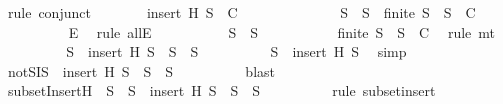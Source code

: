 \begin{isabellebody}
\ {\isacharparenleft}rule\ conjunct{}{\isacharparenright}\isanewline
\ \ \ \ \isamarkupfalse%
\ \isamarkupfalse%
\ {\isachardoublequoteopen}insert\ H\ S{}\ {\isasymnotin}\ C{\isachardoublequoteclose}\isanewline
\ \ \ \ \isamarkupfalse%
\ {\isacharminus}\isanewline
\ \ \ \ \ \ \isamarkupfalse%
\ {\isachardoublequoteopen}S{}\ {\isasymsubseteq}\ S\ {\isasymlongrightarrow}\ finite\ S{}\ {\isasymlongrightarrow}\ S{}\ {\isasymin}\ C{\isachardoublequoteclose}\isanewline
\ \ \ \ \ \ \ \ \isamarkupfalse%
\ E{\isacharprime}\ \isamarkupfalse%
\ {\isacharparenleft}rule\ allE{\isacharparenright}\isanewline
\ \ \ \ \ \ \isamarkupfalse%
\ \isamarkupfalse%
\ {\isachardoublequoteopen}{\isasymnot}\ S{}\ {\isasymsubseteq}\ S{\isachardoublequoteclose}\isanewline
\ \ \ \ \ \ \ \ \isamarkupfalse%
\ {\isacartoucheopen}{\isasymnot}\ {\isacharparenleft}finite\ S{}\ {\isasymlongrightarrow}\ S{}\ {\isasymin}\ C{\isacharparenright}{\isacartoucheclose}\ \isamarkupfalse%
\ {\isacharparenleft}rule\ mt{\isacharparenright}\isanewline
\ \ \ \ \ \ \isamarkupfalse%
\ \isamarkupfalse%
\ {\isachardoublequoteopen}{\isacharparenleft}S{}\ {\isasymsubseteq}\ insert\ H\ S{\isacharparenright}\ {\isasymnoteq}\ {\isacharparenleft}S{}\ {\isasymsubseteq}\ S{\isacharparenright}{\isachardoublequoteclose}\isanewline
\ \ \ \ \ \ \ \ \isamarkupfalse%
\ {\isacartoucheopen}S{}\ {\isasymsubseteq}\ insert\ H\ S{\isacartoucheclose}\ \isamarkupfalse%
\ simp\ \isanewline
\ \ \ \ \ \ \isamarkupfalse%
\ \isamarkupfalse%
\ notSI{\isacharcolon}{\isachardoublequoteopen}{\isasymnot}{\isacharparenleft}S{}\ {\isasymsubseteq}\ insert\ H\ S\ {\isasymlongleftrightarrow}\ S{}\ {\isasymsubseteq}\ S{\isacharparenright}{\isachardoublequoteclose}\isanewline
\ \ \ \ \ \ \ \ \isamarkupfalse%
\ blast\ \isanewline
\ \ \ \ \ \ \isamarkupfalse%
\ subsetInsert{\isacharcolon}{\isachardoublequoteopen}H\ {\isasymnotin}\ S{}\ {\isasymLongrightarrow}\ S{}\ {\isasymsubseteq}\ insert\ H\ S\ {\isasymlongleftrightarrow}\ S{}\ {\isasymsubseteq}\ S{\isachardoublequoteclose}\isanewline
\ \ \ \ \ \ \ \ \isamarkupfalse%
\ {\isacharparenleft}rule\ subset{\isacharunderscore}insert{\isacharparenright}\isanewline

\end{isabellebody}
